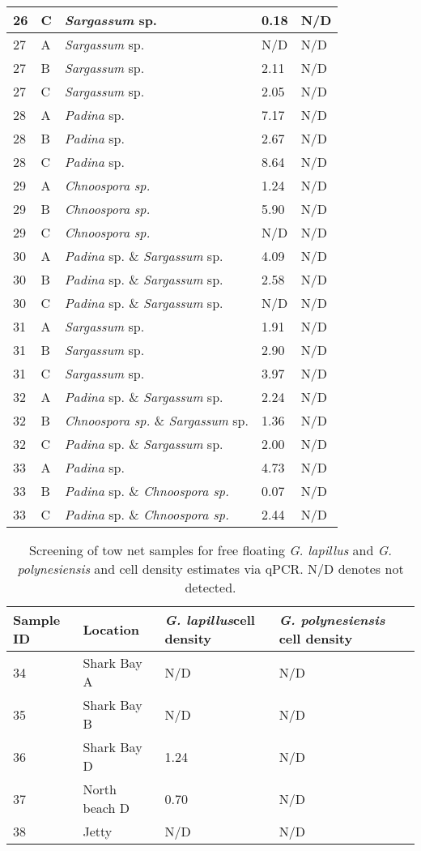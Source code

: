 \documentclass[12pt]{article}
\begin{document}
\begin{longtable}{ | p{2cm} | p{2cm} | p{3cm} | p{3.5cm} | p{3.5cm} | }
\hline
26&C&\emph{Sargassum} sp.&0.18
&N/D\\
\hline
27&A&\emph{Sargassum} sp.&N/D&N/D\\
\hline
27&B&\emph{Sargassum} sp.&2.11
&N/D\\
\hline
27&C&\emph{Sargassum} sp.&2.05
&N/D\\
\hline
28&A&\emph{Padina} sp.&7.17
&N/D\\
\hline
28&B&\emph{Padina} sp.&2.67
&N/D\\
\hline
28&C&\emph{Padina} sp.&8.64
&N/D\\
\hline
29&A&\emph{Chnoospora sp.}&1.24
&N/D\\
\hline
29&B&\emph{Chnoospora sp.}&5.90
&N/D\\
\hline
29&C&\emph{Chnoospora sp.}&N/D&N/D\\
\hline
30&A&\emph{Padina} sp. \& \emph{Sargassum} sp.&4.09
&N/D\\
\hline
30&B&\emph{Padina} sp. \& \emph{Sargassum} sp.&2.58
&N/D\\
\hline
30&C&\emph{Padina} sp. \& \emph{Sargassum} sp.&N/D&N/D\\
\hline
31&A&\emph{Sargassum} sp.&1.91
&N/D\\
\hline
31&B&\emph{Sargassum} sp.&2.90
&N/D\\
\hline
31&C&\emph{Sargassum} sp.&3.97
&N/D\\
\hline
32&A&\emph{Padina} sp. \& \emph{Sargassum} sp.&2.24
&N/D\\
\hline
32&B&\emph{Chnoospora sp.} \& \emph{Sargassum} sp.&1.36
&N/D\\
\hline
32&C&\emph{Padina} sp. \& \emph{Sargassum} sp.&2.00
&N/D\\
\hline
33&A&\emph{Padina} sp.&4.73
&N/D\\
\hline
33&B&\emph{Padina} sp. \& \emph{Chnoospora sp.}&0.07
&N/D\\
\hline
33&C&\emph{Padina} sp. \& \emph{Chnoospora sp.}&2.44
&N/D\\
\hline
\end{longtable}
\FloatBarrier
\FloatBarrier
\begin{table}
\caption{Screening of tow net samples for free floating \emph{G. lapillus} and \emph{G. polynesiensis} and cell density estimates via qPCR. N/D denotes not detected.}
\label{tbl:NetTable}
\begin{tabular}{ | p{4cm} | p{4cm} |p{4cm} | p{4cm} | }
\hline
\textbf{Sample ID}&\textbf{Location}&\textbf{\emph{G. lapillus}cell density}&\textbf{\emph{G. polynesiensis} cell density}\\
\hline
34&Shark Bay A&N/D&N/D\\ %
\hline
35&Shark Bay B&N/D&N/D\\
\hline
36&Shark Bay D&1.24
&N/D\\
\hline
37&North beach D&0.70
&N/D\\
\hline
38&Jetty&N/D
&N/D\\
\hline
\end{tabular}
\end{table}
\FloatBarrier
\newpage
\end{document}
